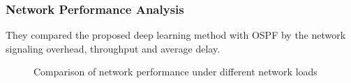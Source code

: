 \documentclass[11pt]{report}
\begin{document}
	\subsubsection{Network Performance Analysis}
	They compared the proposed deep learning method with OSPF by the network signaling overhead, throughput and average delay. 
	\begin{figure}[!htbp]
	\centering
	\caption{Comparison of network performance under different network loads}
	\end{figure}
	
\end{document}
